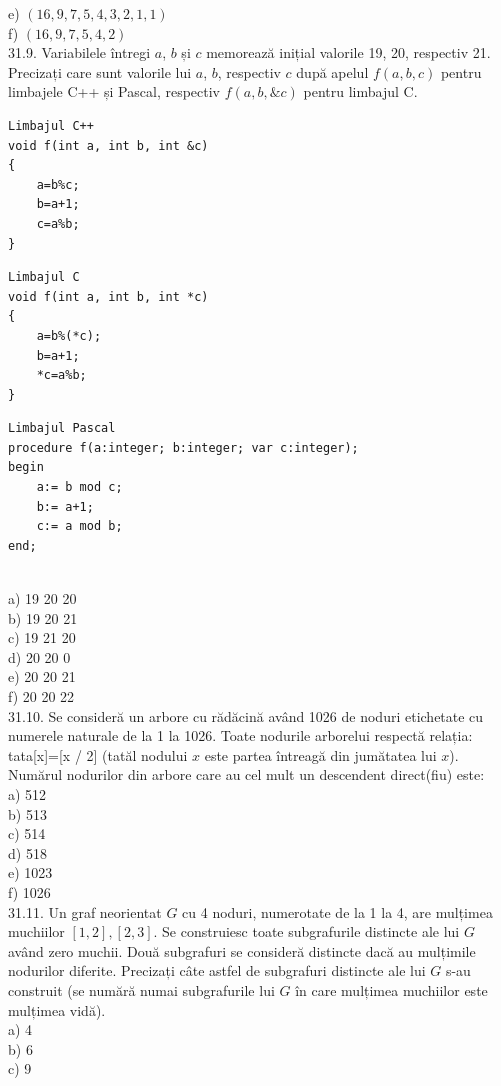 \begin{itemize}
\begin{enumerate}
e) $(16,9,7,5,4,3,2,1,1)$
\\
f) $(16,9,7,5,4,2)$
\\
31.9. Variabilele întregi $a$, $b$ și $c$ memorează inițial valorile 19, 20, respectiv 21. Precizați care sunt valorile lui $a$, $b$, respectiv $c$ după apelul $f(a, b, c)$ pentru limbajele C++ și Pascal, respectiv $f(a, b, \&c)$ pentru limbajul C.
\begin{verbatim}
Limbajul C++
void f(int a, int b, int &c)
{
    a=b%c;
    b=a+1;
    c=a%b;
}
\end{verbatim}
\begin{verbatim}
Limbajul C
void f(int a, int b, int *c)
{
    a=b%(*c);
    b=a+1;
    *c=a%b;
}
\end{verbatim}
\begin{verbatim}
Limbajul Pascal
procedure f(a:integer; b:integer; var c:integer);
begin
    a:= b mod c;
    b:= a+1;
    c:= a mod b;
end;
\end{verbatim}
\\
a) 19 20 20
\\
b) 19 20 21
\\
c) 19 21 20
\\
d) 20 20 0
\\
e) 20 20 21
\\
f) 20 20 22
\\
31.10. Se consideră un arbore cu rădăcină având 1026 de noduri etichetate cu numerele naturale de la 1 la 1026. Toate nodurile arborelui respectă relația: tata[x]=[x / 2] (tatăl nodului $x$ este partea întreagă din jumătatea lui $x$). Numărul nodurilor din arbore care au cel mult un descendent direct(fiu) este:
\\
a) 512
\\
b) 513
\\
c) 514
\\
d) 518
\\
e) 1023
\\
f) 1026
\\
31.11. Un graf neorientat $G$ cu 4 noduri, numerotate de la 1 la 4, are mulțimea muchiilor ${[1,2],[2,3]}$. Se construiesc toate subgrafurile distincte ale lui $G$ având zero muchii. Două subgrafuri se consideră distincte dacă au mulțimile nodurilor diferite. Precizați câte astfel de subgrafuri distincte ale lui $G$ s-au construit (se numără numai subgrafurile lui $G$ în care mulțimea muchiilor este mulțimea vidă).
\\
a) 4
\\
b) 6
\\
c) 9
\\

\end{enumerate}
\end{itemize}
